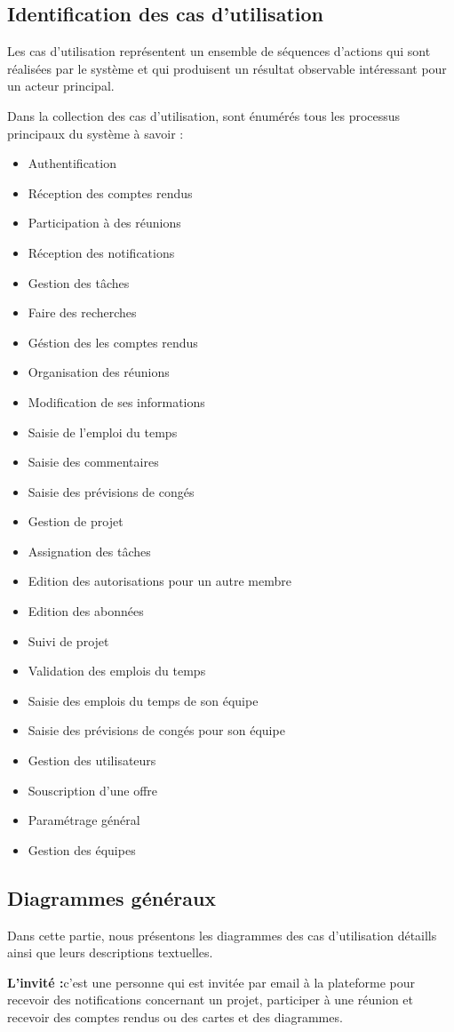 \subsection{ Identification des cas d’utilisation}
\hspace{4mm}Les cas d’utilisation représentent un ensemble de séquences d’actions qui sont réalisées par le système et qui produisent un résultat observable intéressant pour un acteur principal. 
\par Dans la collection des cas d’utilisation, sont énumérés tous les processus principaux du système à savoir :
\begin{itemize}
    \item 	Authentification
    \item 	Réception des comptes rendus
    \item 	Participation à des réunions
    \item	Réception des notifications
    \item	Gestion des tâches
    \item	Faire des recherches
    \item	Géstion des les comptes rendus
    \item	Organisation des réunions
    \item	Modification de ses informations
    \item	Saisie de l'emploi du temps
    \item	Saisie des commentaires
    \item	Saisie des prévisions de congés
    \item	Gestion de projet
    \item	Assignation des tâches
    \item	Edition des autorisations pour un autre membre
    \item	Edition des abonnées
    \item	Suivi de projet
    \item	Validation des emplois du temps
    \item	Saisie des emplois du temps de son équipe
    \item	Saisie des prévisions de congés pour son équipe
    \item	Gestion des utilisateurs
    \item	Souscription d'une offre
    \item	Paramétrage général
    \item	Gestion des équipes
\end{itemize}\newpage
\subsection{	Diagrammes généraux}
\hspace{4mm}Dans cette partie, nous présentons les diagrammes des cas d’utilisation détaills ainsi que leurs descriptions textuelles.
\par	\textbf{L’invité :}c’est une personne qui est invitée par email à la plateforme pour recevoir des notifications concernant un projet, participer à une réunion et recevoir des comptes rendus ou des cartes et des diagrammes.

